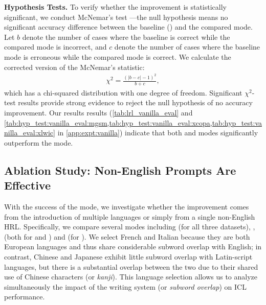 \vspace{2pt}\noindent\textbf{Hypothesis Tests.} \label{sec:icl_mode_eval:hyp_test}
To verify whether the improvement is statistically significant, we conduct McNemar's test \cite{mcnemar}---the null hypothesis means no significant accuracy difference between the baseline (\english) and the compared mode.
Let $b$ denote the number of cases where the baseline is correct while the compared mode is incorrect, and $c$ denote the number of cases where the baseline mode is erroneous while the compared mode is correct.
We calculate the corrected version \cite{corrected_mcnemar} of the McNemar's statistic:
\begin{equation}
    \begin{aligned}
        \chi^2 = \frac{\left( |b-c| -1 \right)^2}{b+c},
    \end{aligned}
    \label{eq:mcnemar}
\end{equation}
which has a chi-squared distribution with one degree of freedom.
Significant $\chi^2$-test results provide strong evidence to reject the null hypothesis of no accuracy improvement.
Our results results (\cref{tab:lrl_vanilla_eval} and \cref{tab:hyp_test:vanilla_eval:mgsm,tab:hyp_test:vanilla_eval:xcopa,tab:hyp_test:vanilla_eval:xlwic} in \cref{app:expt:vanilla}) indicate that both \multilingual and \native modes significantly outperform the \english mode.








\subsection{Ablation Study: Non-English \monolingual Prompts Are Effective} \label{sec:icl_mode_eval:monolingual}

With the success of the \multilingual mode, we investigate whether the improvement comes from the introduction of multiple languages or simply from a single non-English HRL.
Specifically, we compare several \monolingual modes including \chinese (for all three datasets), \french, \japanese (both for \mgsm and \xlwic) and \italian (for \xcopa).
We select French and Italian because they are both European languages and thus share considerable subword overlap with English; in contrast, Chinese and Japanese exhibit little subword overlap with Latin-script languages, but there is a substantial overlap between the two due to their shared use of Chinese characters (or \textit{kanji}). This language selection allows us to analyze simultaneously the impact of the writing system (or \textit{subword overlap}) on ICL performance.

